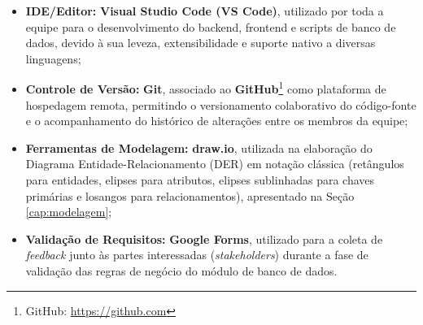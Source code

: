 \begin{itemize}
    \item \textbf{IDE/Editor:} \textbf{Visual Studio Code (VS Code)}, utilizado por toda a equipe para o desenvolvimento do backend, frontend e scripts de banco de dados, devido à sua leveza, extensibilidade e suporte nativo a diversas linguagens;
    \item \textbf{Controle de Versão:} \textbf{Git}, associado ao \textbf{GitHub}\footnote{GitHub: \url{https://github.com}} como plataforma de hospedagem remota, permitindo o versionamento colaborativo do código-fonte e o acompanhamento do histórico de alterações entre os membros da equipe;
    \item \textbf{Ferramentas de Modelagem:} \textbf{draw.io}, utilizada na elaboração do Diagrama Entidade-Relacionamento (DER) em notação clássica (retângulos para entidades, elipses para atributos, elipses sublinhadas para chaves primárias e losangos para relacionamentos), apresentado na Seção \ref{cap:modelagem};
    \item \textbf{Validação de Requisitos:} \textbf{Google Forms}, utilizado para a coleta de \textit{feedback} junto às partes interessadas (\textit{stakeholders}) durante a fase de validação das regras de negócio do módulo de banco de dados.
\end{itemize}

